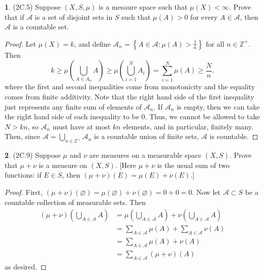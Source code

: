 \documentclass[12pt]{article}
\theoremstyle{definition}
\newtheorem{ex}{}
\begin{document}
\begin{ex}
	(2C.5)
	Suppose $(X, S, \mu)$ is a mesaure space such that $\mu(X) < \infty$.
	Prove that if $\mathcal{A}$ is a set of disjoint sets in $S$ such that $\mu(A) > 0$ for every $A \in \mathcal{A}$, then $\mathcal{A}$ is a countable set.
\end{ex}
\begin{proof}
	Let $\mu(X) = k$, and define $\mathcal{A}_n = \left\lbrace A \in \mathcal{A} : \mu(A) > \frac{1}{n} \right\rbrace$ for all $n \in \mathbb{Z^+}$.
	Then \begin{equation*}
		k \geq \mu \left( \bigcup_{A \in A_n} A \right) \geq \mu \left( \bigcup_{i = 1}^N A_i \right) = \sum_{i = 1}^N \mu(A) \geq \frac{N}{n}.
	\end{equation*}
	where the first and second inequalities come from monotonicity and the equality comes from finite additivity.
	Note that the right hand side of the first inequality just represents any finite sum of elements of $\mathcal{A}_n$.
	If $\mathcal{A}_n$ is empty, then we can take the right hand side of each inequality to be 0.
	Thus, we cannot be allowed to take $N > kn$, so $\mathcal{A}_n$ must have at most $kn$ elements, and in particular, finitely many.
	Then, since $\mathcal{A} = \bigcup_{n \in \mathbb{Z}^+} \mathcal{A}_n$ is a countable union of finite sets, $\mathcal{A}$ is countable.
\end{proof}

\begin{ex}
	(2C.9)
	Suppose $\mu$ and $\nu$ are measures on a measurable space $(X, S)$.
	Prove that $\mu + \nu$ is a measure on $(X, S)$.
		[Here $\mu + \nu$ is the usual sum of two functions: if $E \in S$, then $(\mu + \nu)(E) = \mu(E) + \nu(E)$.]
\end{ex}
\begin{proof}
	First, $(\mu + \nu)(\varnothing) = \mu(\varnothing) + \nu(\varnothing) = 0 + 0 = 0$.
	Now let $\mathcal{A} \subset S$ be a countable collection of measurable sets.
	Then \begin{align*}
		(\mu + \nu)\left( \bigcup_{A \in \mathcal{A}} A \right) & = \mu\left( \bigcup_{A \in \mathcal{A}} A \right) + \nu\left( \bigcup_{A \in \mathcal{A}} A \right) \\
		                                                        & = \sum_{A \in \mathcal{A}}\mu(A) + \sum_{A \in \mathcal{A}}\nu(A)                                   \\
		                                                        & = \sum_{A \in \mathcal{A}}\mu(A) + \nu(A)                                                           \\
		                                                        & = \sum_{A \in \mathcal{A}}(\mu + \nu)(A)
	\end{align*}
	as desired.
\end{proof}
\end{document}
